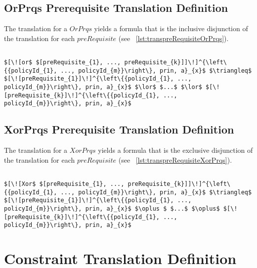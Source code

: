 \subsection{OrPrqs Prerequisite Translation Definition}
The translation for a $OrPrqs$ yields a formula that is the inclusive disjunction of the translation for each $preRequisite$ (see ~\ref{lst:transpreRequisiteOrPrqs}).

\lstset{mathescape, language=AST}  
\begin{lstlisting}[frame=single, caption={Prerequisite Translation Definition {$\colon$} Inclusive Disjunction},label={lst:transpreRequisiteOrPrqs}]

$[\![or$ $[preRequisite_{1}, ..., preRequisite_{k}]]\!]^{\left\{{policyId_{1}, ..., policyId_{m}}\right\}, prin, a}_{x}$ $\triangleq$ $[\![preRequisite_{1}]\!]^{\left\{{policyId_{1}, ..., policyId_{m}}\right\}, prin, a}_{x}$ $\lor$ $...$ $\lor$ $[\![preRequisite_{k}]\!]^{\left\{{policyId_{1}, ..., policyId_{m}}\right\}, prin, a}_{x}$

\end{lstlisting}

\subsection{XorPrqs Prerequisite Translation Definition}
The translation for a $XorPrqs$ yields a formula that is the exclusive disjunction of the translation for each $preRequisite$ (see ~\ref{lst:transpreRequisiteXorPrqs}).

\lstset{mathescape, language=AST}  
\begin{lstlisting}[frame=single, caption={Prerequisite Translation Definition {$\colon$} Exclusive Disjunction},label={lst:transpreRequisiteXorPrqs}]

$[\![Xor$ $[preRequisite_{1}, ..., preRequisite_{k}]]\!]^{\left\{{policyId_{1}, ..., policyId_{m}}\right\}, prin, a}_{x}$ $\triangleq$ $[\![preRequisite_{1}]\!]^{\left\{{policyId_{1}, ..., policyId_{m}}\right\}, prin, a}_{x}$ $\oplus $ $...$ $\oplus$ $[\![preRequisite_{k}]\!]^{\left\{{policyId_{1}, ..., policyId_{m}}\right\}, prin, a}_{x}$

\end{lstlisting}


\section{Constraint Translation Definition}\label{sec:constraintTransDefSec}

